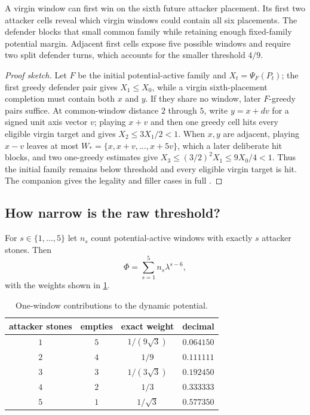 \begin{plainterms}
A virgin window can first win on the sixth future attacker placement.  Its
first two attacker cells reveal which virgin windows could contain all six
placements.  The defender blocks that small common family while retaining
enough fixed-family potential margin.  Adjacent first cells expose five
possible windows and require two split defender turns, which accounts for the
smaller threshold $4/9$.
\end{plainterms}

\begin{proof}[Proof sketch]
Let $F$ be the initial potential-active family and $X_t=\Psi_F(P_t)$; the first greedy
defender pair gives $X_1\leq X_0$, while a virgin sixth-placement completion
must contain both $x$ and $y$.
If they share no window, later $F$-greedy pairs suffice.
At common-window distance $2$ through $5$, write $y=x+dv$ for a signed unit
axis vector $v$; playing $x+v$ and then one greedy cell hits every eligible
virgin target and gives $X_2\leq3X_1/2<1$.
When $x,y$ are adjacent, playing $x-v$ leaves at most
$W_*=\{x,x+v,\ldots,x+5v\}$, which a later deliberate hit blocks, and two
one-greedy estimates give $X_3\leq(3/2)^2X_1\leq9X_0/4<1$.
Thus the initial family remains below threshold and every eligible virgin
target is hit.
The companion gives the legality and filler cases in full
\cite{hexobot-companions}.
\end{proof}

\subsection{How narrow is the raw threshold?}

For $s\in\{1,\ldots,5\}$ let $n_s$ count potential-active windows with exactly
$s$ attacker stones.  Then
\[
 \Phi=\sum_{s=1}^{5}n_s\lambda^{s-6},
\]
with the weights shown in \cref{tab:potential-weights}.

\begin{table}[tb]
\centering
\caption{One-window contributions to the dynamic potential.}
\label{tab:potential-weights}
\begin{tabular}{cccc}
\toprule
attacker stones & empties & exact weight & decimal\\
\midrule
$1$ & $5$ & $1/(9\sqrt3)$ & $0.064150$\\
$2$ & $4$ & $1/9$ & $0.111111$\\
$3$ & $3$ & $1/(3\sqrt3)$ & $0.192450$\\
$4$ & $2$ & $1/3$ & $0.333333$\\
$5$ & $1$ & $1/\sqrt3$ & $0.577350$\\
\bottomrule
\end{tabular}
\end{table}

